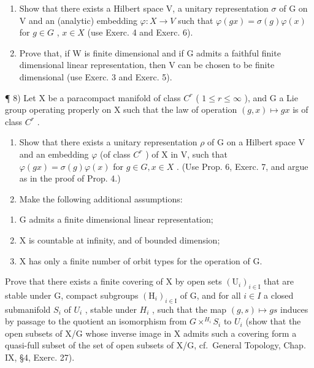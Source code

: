 \begin{enumerate}
\begin{enumerate}
\def\labelenumi{\alph{enumi})}
\item
  Show that there exists a Hilbert space V, a unitary representation \(\sigma\) of G on V and an (analytic) embedding \(\varphi: X \to V\) such that \(\varphi(gx) = \sigma(g)\varphi(x)\) for \(g \in G\) , \(x \in X\) (use Exerc. 4 and Exerc. 6).
\item
  Prove that, if W is finite dimensional and if G admits a faithful finite dimensional linear representation, then V can be chosen to be finite dimensional (use Exerc. 3 and Exerc. 5).
\end{enumerate}

¶ 8) Let X be a paracompact manifold of class \(C^{r}\) ( \(1 \leq r \leq \infty\) ), and G a Lie group operating properly on X such that the law of operation \((g, x) \mapsto gx\) is of class \(C^{r}\) .

\begin{enumerate}
\def\labelenumi{\alph{enumi})}
\item
  Show that there exists a unitary representation \(\rho\) of G on a Hilbert space V and an embedding \(\varphi\) (of class \(C^{r}\) ) of X in V, such that \(\varphi(gx) = \sigma(g)\varphi(x)\) for \(g \in G, x \in X\) . (Use Prop. 6, Exerc. 7, and argue as in the proof of Prop. 4.)
\item
  Make the following additional assumptions:
\end{enumerate}

\begin{enumerate}
\def\labelenumi{(\roman{enumi})}
\item
  G admits a finite dimensional linear representation;
\item
  \(\mathrm{X}\) is countable at infinity, and of bounded dimension;
\item
  X has only a finite number of orbit types for the operation of G.
\end{enumerate}

Prove that there exists a finite covering of X by open sets \((\mathrm{U}_{i})_{i\in\mathrm{I}}\) that are stable under G, compact subgroups \((\mathrm{H}_{i})_{i\in\mathrm{I}}\) of G, and for all \(i\in I\) a closed submanifold \(S_{i}\) of \(U_{i}\) , stable under \(H_{i}\) , such that the map \((g,s)\mapsto gs\) induces by passage to the quotient an isomorphism from \(G\times^{H_{i}}S_{i}\) to \(U_{i}\) (show that the open subsets of X/G whose inverse image in X admits such a covering form a quasi-full subset of the set of open subsets of X/G, cf.~General Topology, Chap. IX, §4, Exerc. 27).


\end{enumerate}
